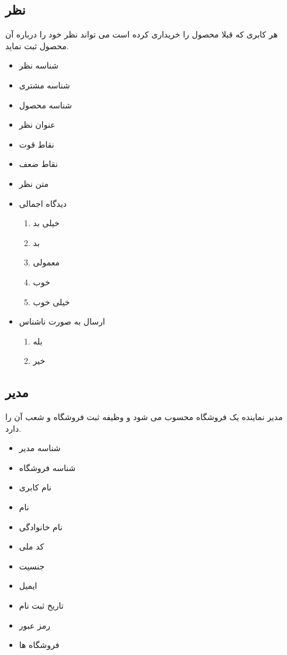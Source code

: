 \documentclass[]{article}
\begin{document}
\subsection{نظر}
هر کابری که قبلا محصول را خریداری کرده است می تواند نظر خود را درباره آن محصول ثبت نماید.
\begin{itemize}
\item شناسه نظر
\item شناسه مشتری
\item شناسه محصول
\item عنوان نظر
\item نقاط قوت  
\item نقاط ضعف
\item متن نظر
\item دیدگاه اجمالی
\begin{enumerate}
\item خیلی بد
\item بد
\item معمولی
\item  خوب
\item  خیلی خوب
\end{enumerate}
\item ارسال به صورت ناشناس
\begin{enumerate}
\item بله
\item خیر
\end{enumerate}
\end{itemize}





\subsection{مدیر}
مدیر نماینده یک فروشگاه محسوب می شود و وظیفه ثبت فروشگاه و شعب آن را دارد.
\begin{itemize}
\item شناسه مدیر
\item شناسه فروشگاه
\item نام کابری
\item نام
\item نام خانوادگی
\item کد ملی
\item جنسیت
\item ایمیل
\item تاریخ ثبت نام
\item رمز عبور 
\item فروشگاه ها
\end{itemize}
\end{document}

